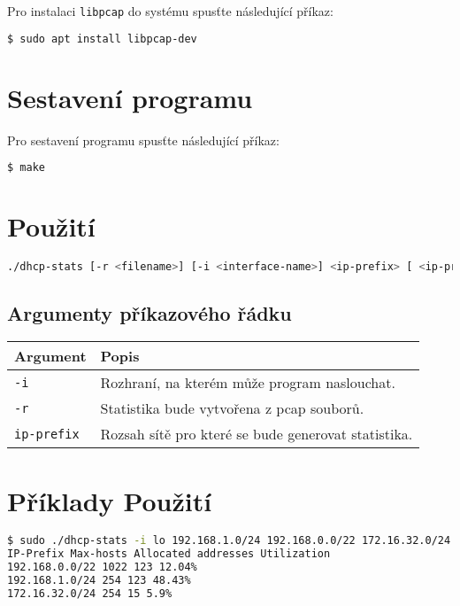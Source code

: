 \documentclass[a4paper, 11pt]{article}
\begin{document}
    Pro instalaci \texttt{libpcap} do systému spusťte následující příkaz:

    \begin{lstlisting}[language=bash]
$ sudo apt install libpcap-dev
    \end{lstlisting}


    \section{Sestavení programu}
    Pro sestavení programu spusťte následující příkaz:

    \begin{lstlisting}[language=bash]
$ make
    \end{lstlisting}

    \section{Použití}
    \begin{lstlisting}[language=bash, basicstyle=\fontsize{10}{10}\selectfont]
./dhcp-stats [-r <filename>] [-i <interface-name>] <ip-prefix> [ <ip-prefix> [ ... ] ]
    \end{lstlisting}

    \subsection{Argumenty příkazového řádku}
    \begin{tabular}{|l|l|}
        \hline
        \textbf{Argument} & \textbf{Popis} \\
        \hline
        \texttt{-i} & Rozhraní, na kterém může program naslouchat. \\
        \texttt{-r} & Statistika bude vytvořena z pcap souborů. \\
        \texttt{ip-prefix} & Rozsah sítě pro které se bude generovat statistika. \\
        \hline
    \end{tabular}

    \section{Příklady Použití}
    \begin{lstlisting}[language=bash]
$ sudo ./dhcp-stats -i lo 192.168.1.0/24 192.168.0.0/22 172.16.32.0/24
IP-Prefix Max-hosts Allocated addresses Utilization
192.168.0.0/22 1022 123 12.04%
192.168.1.0/24 254 123 48.43%
172.16.32.0/24 254 15 5.9%
    \end{lstlisting}
\end{document}
